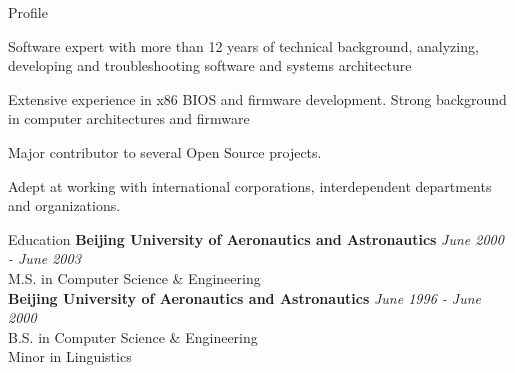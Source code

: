 \documentclass{resume} %
\begin{document}

\begin{rSection}{Profile}

\item Software expert with more than 12 years of technical background, analyzing, developing and troubleshooting software and systems architecture
\item Extensive experience in x86 BIOS and firmware development. Strong background in computer architectures and firmware
\item Major contributor to several Open Source projects.
\item Adept at working with international corporations, interdependent departments and organizations.

\end{rSection}



\begin{rSection}{Education}
{\bf Beijing University of Aeronautics and Astronautics } \hfill {\em June 2000 - June 2003} \\ 
M.S. in Computer Science \& Engineering \\


{\bf Beijing University of Aeronautics and Astronautics } \hfill {\em June 1996 - June 2000} \\ 
B.S. in Computer Science \& Engineering \\
Minor in Linguistics \smallskip \\

\end{rSection}

\end{document}
